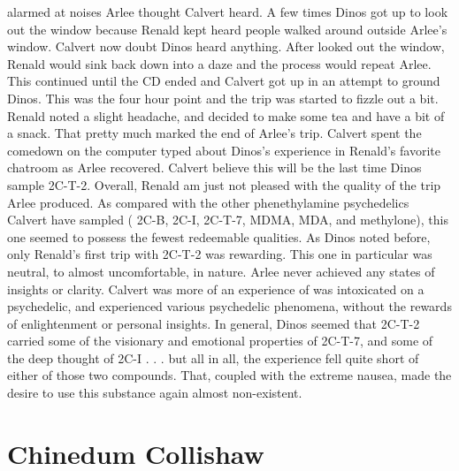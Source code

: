 \documentclass[12pt]{book}
\begin{document}
alarmed at noises Arlee thought Calvert heard. A few times Dinos got up to look out the window because Renald kept heard people walked around outside Arlee's window. Calvert now doubt Dinos heard anything. After looked out the window, Renald would sink back down into a daze and the process would repeat Arlee. This continued until the CD ended and Calvert got up in an attempt to ground Dinos. This was the four hour point and the trip was started to fizzle out a bit. Renald noted a slight headache, and decided to make some tea and have a bit of a snack. That pretty much marked the end of Arlee's trip. Calvert spent the comedown on the computer typed about Dinos's experience in Renald's favorite chatroom as Arlee recovered. Calvert believe this will be the last time Dinos sample 2C-T-2. Overall, Renald am just not pleased with the quality of the trip Arlee produced. As compared with the other phenethylamine psychedelics Calvert have sampled ( 2C-B, 2C-I, 2C-T-7, MDMA, MDA, and methylone), this one seemed to possess the fewest redeemable qualities. As Dinos noted before, only Renald's first trip with 2C-T-2 was rewarding. This one in particular was neutral, to almost uncomfortable, in nature. Arlee never achieved any states of insights or clarity. Calvert was more of an experience of was intoxicated on a psychedelic, and experienced various psychedelic phenomena, without the rewards of enlightenment or personal insights. In general, Dinos seemed that 2C-T-2 carried some of the visionary and emotional properties of 2C-T-7, and some of the deep thought of 2C-I . . . but all in all, the experience fell quite short of either of those two compounds. That, coupled with the extreme nausea, made the desire to use this substance again almost non-existent.



\chapter{Chinedum Collishaw}
\end{document}
